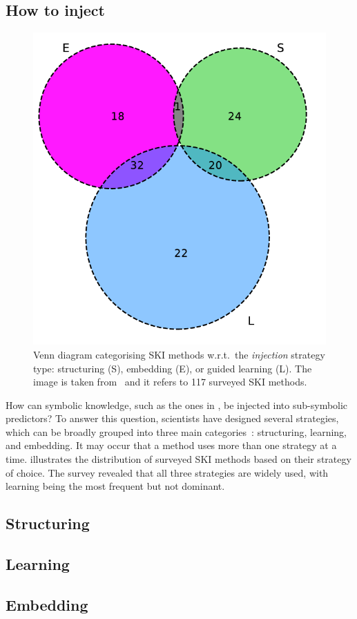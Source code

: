 \subsection{How to inject}\label{subsec:how-to-inject}
%
\begin{figure}
    \centering
    \includegraphics[width=.4\linewidth]{figures/ski-integration}
    \caption[Venn diagram categorising SKI methods]{
        Venn diagram categorising SKI methods w.r.t.\ the \emph{injection} strategy type: structuring (S), embedding (E), or guided learning (L).
        The image is taken from~\cite{DBLP:journals/csur/CiattoSAMO24} and it refers to 117 surveyed \gls{SKI} methods.
    }
    \label{fig:pie-ski-injection}
\end{figure}
%
How can symbolic knowledge, such as the ones in , be injected into sub-symbolic predictors?
%
To answer this question, scientists have designed several strategies, which can be broadly grouped into three main categories~\cite{DBLP:journals/csur/CiattoSAMO24}: structuring, learning, and embedding.
%
It may occur that a method uses more than one strategy at a time.
%
 illustrates the distribution of surveyed \gls{SKI} methods based on their strategy of choice.
%
The survey revealed that all three strategies are widely used, with learning being the most frequent but not dominant.


\subsection{Structuring}\label{subsec:structuring}
%



\subsection{Learning}\label{subsec:learning}

\subsection{Embedding}\label{subsec:ski-embedding}

